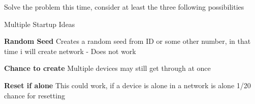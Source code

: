 Solve the problem this time, consider at least the three following possibilities


Multiple Startup Ideas

\textbf{Random Seed}
Creates a random seed from ID or some other number, in that time i will create network - Does not work

\textbf{Chance to create}
Multiple devices may still get through at once

\textbf{Reset if alone}
This could work, if a device is alone in a network is alone  1/20 chance for resetting